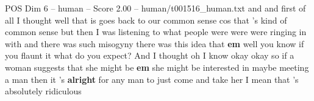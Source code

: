 \begin{textsample}{POS Dim 6 – human – Score 2.00 – human/t001516\_human.txt}  \label{ex:f6_pos_002}
and and first of all I thought well that is goes back to our common sense cos that 's kind of common sense but then I was listening to what people were were were ringing in with and there was such misogyny there was this idea that \textbf{em} well you know if you flaunt it what do you expect?
And I thought oh I know okay okay so if a woman suggests that she might be \textbf{em} she might be interested in maybe meeting a man then it 's \textbf{alright} for any man to just come and take her I mean that 's absolutely ridiculous

\end{textsample}
